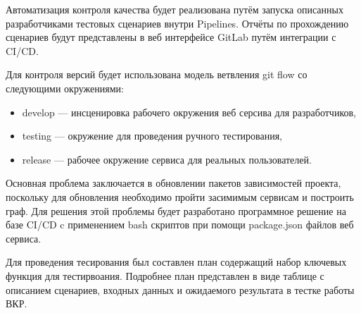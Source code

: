 Автоматизация контроля качества будет реализована путём запуска описанных разработчиками тестовых сценариев внутри Pipelines.
Отчёты по прохождению сценариев будут представлены в веб интерфейсе GitLab путём интеграции с CI/CD.

Для контроля версий будет использована модель ветвления git flow со следующими окружениями:

\begin{itemize}
    \item develop --- инсценировка рабочего окружения веб серсива для разработчиков,
    \item testing --- окружение для проведения ручного тестирования,
    \item release --- рабочее окружение сервиса для реальных пользователей.
\end{itemize}

Основная проблема заключается в обновлении пакетов зависимостей проекта, поскольку для обновления необходимо пройти засимимым сервисам и построить граф.
Для решения этой проблемы будет разработано программное решение на базе CI/CD c применением bash скриптов при помощи package.json файлов веб сервиса.

Для проведения тесирования был составлен план содержащий набор ключевых функция для тестирвоания.
Подробнее план представлен в виде таблице с описанием сценариев, входных данных и ожидаемого результата в тестке работы ВКР.


